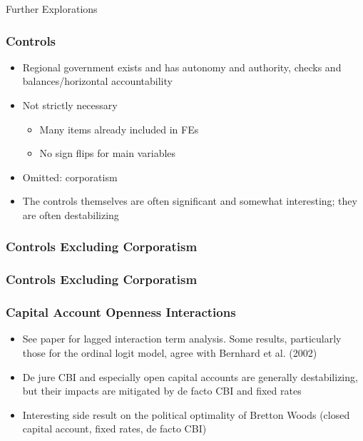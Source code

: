 \documentclass{beamer}
\begin{document}
    \begin{frame}
        \centering Further Explorations
    \end{frame}

    \begin{frame}
        \frametitle{Controls}
        \begin{itemize}
            \item Regional government exists and has autonomy and authority, checks and balances/horizontal accountability
            \item Not strictly necessary
                \begin{itemize}
                    \item Many items already included in FEs
                    \item No sign flips for main variables
                \end{itemize}
            \item Omitted: corporatism
            \item The controls themselves are often significant and somewhat interesting; they are often destabilizing
        \end{itemize}
    \end{frame}

    \begin{frame}
        \frametitle{Controls Excluding Corporatism}
        {
            \let\oldcentering\centering
            \renewcommand\centering{\tiny\oldcentering}
            
        }
    \end{frame}

    \begin{frame}
        \frametitle{Controls Excluding Corporatism}
        {
            \let\oldcentering\centering
            \renewcommand\centering{\tiny\oldcentering}
            
        }
    \end{frame}

    \begin{frame}
        \frametitle{Capital Account Openness Interactions}
        \begin{itemize}
            \item See paper for lagged interaction term analysis. Some results, particularly those for the ordinal logit model, agree with Bernhard et al. (2002)
            \item De jure CBI and especially open capital accounts are generally destabilizing, but their impacts are mitigated by de facto CBI and fixed rates
            \item Interesting side result on the political optimality of Bretton Woods (closed capital account, fixed rates, de facto CBI)
        \end{itemize}
    \end{frame}
\end{document}

